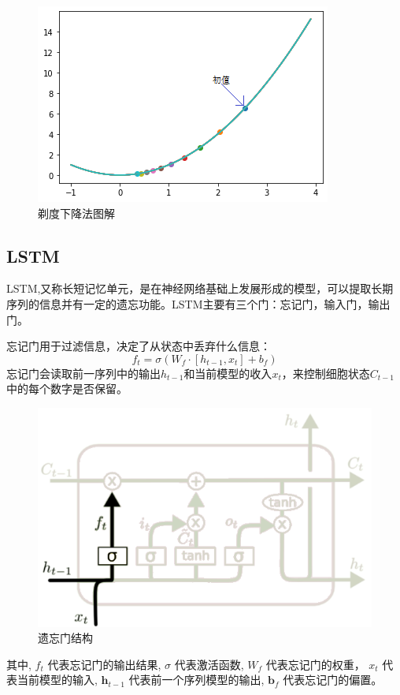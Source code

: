 \begin{figure}[h]
\centering
\includegraphics[scale=0.7,angle=0]{images/5.png}
\caption{剃度下降法图解}
\label{5}
\end{figure}
\subsection{LSTM}
LSTM,又称长短记忆单元，是在神经网络基础上发展形成的模型，可以提取长期序列的信息并有一定的遗忘功能。LSTM主要有三个门：忘记门，输入门，输出门。

忘记门用于过滤信息，决定了从状态中丢弃什么信息：$$f_{t}=\sigma\left(W_{f} \cdot\left[h_{t-1}, x_{t}\right]+b_{f}\right)$$忘记门会读取前一序列中的输出$h_{t-1}$和当前模型的收入$x_t$，来控制细胞状态$C_{t-1}$中的每个数字是否保留。
\begin{figure}[h]
	\centering
	\includegraphics[scale=0.5,angle=0]{images/21.png}
	\caption{遗忘门结构}
	\label{21}
\end{figure}
其中, $ f_{t} $ 代表忘记门的输出结果, $ \sigma $ 代表激活函数,  $W_{f} $ 代表忘记门的权重，  $x_t$ 代表当前模型的输入, $ \boldsymbol{h}_{t-1} $ 代表前一个序列模型的输出, $ \boldsymbol{b}_{f} $ 代表忘记门的偏置。

